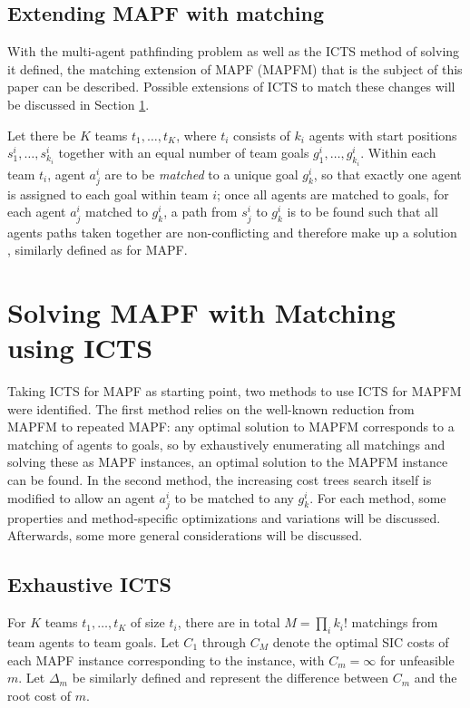 \documentclass[english]{article}
\begin{document}
	\subsection{Extending MAPF with matching}
	With the multi-agent pathfinding problem as well as the ICTS method of solving it defined, the matching extension of MAPF (MAPFM) that is the subject of this paper can be described. Possible extensions of ICTS to match these changes will be discussed in Section \ref{section:icts-matching}.
	
	Let there be $K$ teams $t_1,\ldots, t_K$, where $t_i$ consists of $k_i$ agents with start positions $s_1^i,\ldots,s_{k_i}^i$ together with an equal number of team goals $g_1^i,\ldots,g_{k_i}^i$. Within each team $t_i$, agent $a_j^i$ are to be \textit{matched} to a unique goal $g_k^i$, so that exactly one agent is assigned to each goal within team $i$; once all agents are matched to goals, for each agent $a_j^i$ matched to $g_k^i$, a path from $s_j^i$ to $g_k^i$ is to be found such that all agents paths taken together are non-conflicting and therefore make up a solution \cite{ma2016}, similarly defined as for MAPF.
	

%
	\section{Solving MAPF with Matching using ICTS} %
	\label{section:icts-matching}
	Taking ICTS for MAPF as starting point, two methods to use ICTS for MAPFM were identified. The first method relies on the well-known reduction from MAPFM to repeated MAPF: any optimal solution to MAPFM corresponds to a matching of agents to goals, so by exhaustively enumerating all matchings and solving these as MAPF instances, an optimal solution to the MAPFM instance can be found. In the second method, the increasing cost trees search itself is modified to allow an agent $a_j^i$ to be matched to any $g_k^i$. For each method, some properties and method-specific optimizations and variations will be discussed. Afterwards, some more general considerations will be discussed.
	\subsection{Exhaustive ICTS}
	For $K$ teams $t_1,\ldots,t_K$ of size $t_i$, there are in total $M = \prod_{i} k_i!$ matchings from team agents to team goals. Let $C_1$ through $C_M$ denote the optimal SIC costs of each MAPF instance corresponding to the instance, with $C_m = \infty$ for unfeasible $m$. Let $\Delta_m$ be similarly defined and represent the difference between $C_m$ and the root cost of $m$.
	
\end{document}
